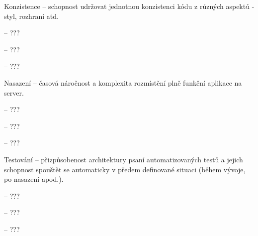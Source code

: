 \begin{dl}
   \item[Konzistence] – schopnost udržovat jednotnou konzistenci kódu z různých aspektů - styl, rozhraní atd.
\end{dl}
\begin{ul}
   \item {} – ???
   \item {} – ???
   \item {} – ???
\end{ul}

\begin{dl}
   \item[Nasazení] – časová náročnost a komplexita rozmístění plně funkční aplikace na server.
\end{dl}
\begin{ul}
   \item {} – ???
   \item {} – ???
   \item {} – ???
\end{ul}

\begin{dl}
   \item[Testování] – přizpůsobenost architektury psaní automatizovaných testů a jejich schopnost spouštět se automaticky v předem definované situaci (během vývoje, po nasazení apod.).
\end{dl}
\begin{ul}
   \item {} – ???
   \item {} – ???
   \item {} – ???
\end{ul}

